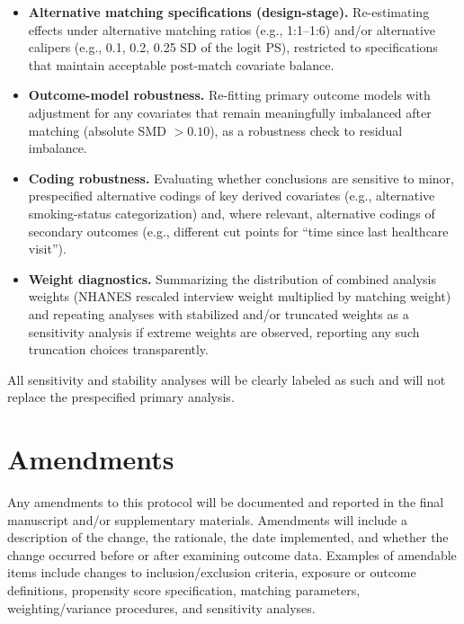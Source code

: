 \documentclass{article}
\begin{document}
\begin{itemize}
    \item \textbf{Alternative matching specifications (design-stage).} Re-estimating effects under alternative matching ratios (e.g., 1:1--1:6) and/or alternative calipers (e.g., 0.1, 0.2, 0.25 SD of the logit PS), restricted to specifications that maintain acceptable post-match covariate balance.

    \item \textbf{Outcome-model robustness.} Re-fitting primary outcome models with adjustment for any covariates that remain meaningfully imbalanced after matching (absolute SMD $>0.10$), as a robustness check to residual imbalance.

    \item \textbf{Coding robustness.} Evaluating whether conclusions are sensitive to minor, prespecified alternative codings of key derived covariates (e.g., alternative smoking-status categorization) and, where relevant, alternative codings of secondary outcomes (e.g., different cut points for ``time since last healthcare visit'').

    \item \textbf{Weight diagnostics.} Summarizing the distribution of combined analysis weights (NHANES rescaled interview weight multiplied by matching weight) and repeating analyses with stabilized and/or truncated weights as a sensitivity analysis if extreme weights are observed, reporting any such truncation choices transparently.
\end{itemize}

All sensitivity and stability analyses will be clearly labeled as such and will not replace the prespecified primary analysis.

\section{Amendments}
Any amendments to this protocol will be documented and reported in the final manuscript and/or supplementary materials. Amendments will include a description of the change, the rationale, the date implemented, and whether the change occurred before or after examining outcome data. Examples of amendable items include changes to inclusion/exclusion criteria, exposure or outcome definitions, propensity score specification, matching parameters, weighting/variance procedures, and sensitivity analyses.

\end{document}
